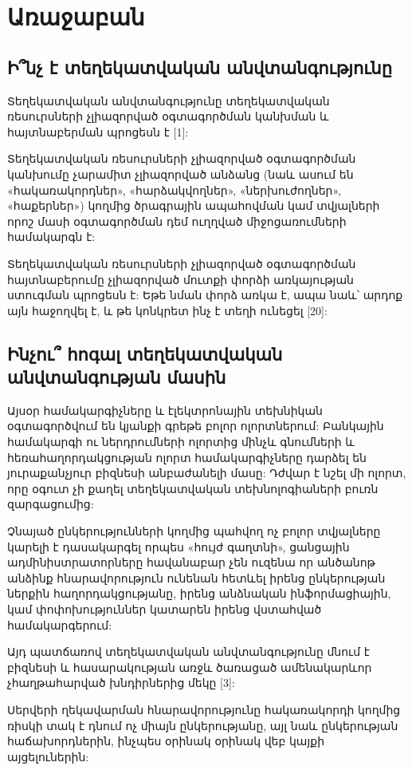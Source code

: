 \documentclass[a4paper,12pt]{article}
\begin{document}
\begin{sloppypar}
\section{Առաջաբան}


\subsection{Ի՞նչ է տեղեկատվական անվտանգությունը}

Տեղեկատվական անվտանգությունը տեղեկատվական ռեսուրսների չլիազորված օգտագործման
կանխման և հայտնաբերման պրոցեսն է [1]:

Տեղեկատվական ռեսուրսների չլիազորված օգտագործման
կանխումը չարամիտ չլիազորված անձանց (նաև ասում են «հակառակորդներ»,
«հարձակվողներ», «ներխուժողներ», «հաքերներ») կողմից ծրագրային ապահովման կամ
տվյալների որոշ մասի օգտագործման դեմ ուղղված միջոցառումների համակարգն է:

Տեղեկատվական ռեսուրսների չլիազորված օգտագործման
հայտնաբերումը չլիազորված մուտքի փորձի առկայության ստուգման պրոցեսն է: Եթե
նման փորձ առկա է, ապա նաև՝ արդոք այն հաջողվել է, և թե կոնկրետ ինչ է տեղի
ունեցել [20]:

\subsection{Ինչու՞ հոգալ տեղեկատվական անվտանգության մասին}

Այսօր համակարգիչները և էլեկտրոնային տեխնիկան օգտագործվում են
կյանքի գրեթե բոլոր ոլորտներում: Բանկային համակարգի ու ներդրումների ոլորտից
մինչև գնումների և հեռահաղորդակցության ոլորտ համակարգիչները դարձել են
յուրաքանչյուր բիզնեսի անբաժանելի մասը: Դժվար է նշել մի ոլորտ, որը
օգուտ չի քաղել տեղեկատվական տեխնոլոգիաների բուռն զարգացումից:

Չնայած ընկերությունների կողմից պահվող ոչ բոլոր տվյալները կարելի է
դասակարգել որպես «հույժ գաղտնի», ցանցային ադմինիստրատորները հավանաբար
չեն ուզենա որ անծանոթ անձինք հնարավորություն ունենան հետևել
իրենց ընկերության ներքին հաղորդակցությանը,
իրենց անձնական ինֆորմացիային, կամ փոփոխություններ կատարեն իրենց վստահված
համակարգերում:

Այդ պատճառով տեղեկատվական անվտանգությունը մնում է բիզնեսի և հասարակության
առջև ծառացած ամենակարևոր չհաղթահարված խնդիրներից մեկը [3]:

Սերվերի ղեկավարման հնարավորությունը հակառակորդի կողմից ռիսկի տակ է
դնում ոչ միայն ընկերությանը, այլ նաև ընկերության հաճախորդներին, ինչպես օրինակ
օրինակ վեբ կայքի այցելուներին:



\end{sloppypar}
\end{document}
